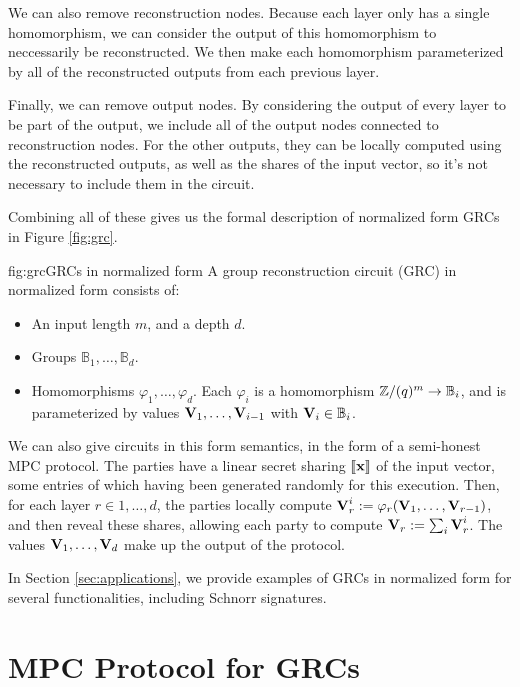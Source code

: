We can also remove reconstruction nodes.
Because each layer only has a single homomorphism, we can consider
the output of this homomorphism to neccessarily be reconstructed.
We then make each homomorphism parameterized by all of the reconstructed
outputs from each previous layer.

Finally, we can remove output nodes.
By considering the output of every layer to be part of the output,
we include all of the output nodes connected to reconstruction nodes.
For the other outputs, they can be locally computed using the reconstructed
outputs, as well as the shares of the input vector, so it's not necessary
to include them in the circuit.

Combining all of these gives us the formal description of normalized form
GRCs in Figure \ref{fig:grc}.

\begin{afigure}{fig:grc}{GRCs in normalized form}
A group reconstruction circuit (GRC) in normalized form consists of:
\begin{itemize}
    \item An input length $m$, and a depth $d$.
    \item Groups $\mathbb{B}_1, \ldots, \mathbb{B}_d$.
    \item Homomorphisms $\varphi_1, \ldots, \varphi_d$. Each $\varphi_i$
    is a homomorphism $\mathbb{Z}/(q)^m \to \mathbb{B}_i$, and is parameterized
    by values $\textbf{V}_1, \ldots, \textbf{V}_{i - 1}$ with $\textbf{V}_i \in \mathbb{B}_i$.
\end{itemize}
\end{afigure}

We can also give circuits in this form semantics, in the form
of a semi-honest MPC protocol.
The parties have a linear secret sharing $\llbracket\textbf{x}\rrbracket$ of
the input vector, some entries of which having been generated randomly
for this execution.
Then, for each layer $r \in 1, \ldots, d$, the parties locally
compute $\textbf{V}_r^i := \varphi_r(\textbf{V}_1, \ldots, \textbf{V}_{r - 1})$,
and then reveal these shares, allowing each party to compute
$\textbf{V}_r := \sum_i \textbf{V}_r^i$.
The values $\textbf{V}_1, \ldots, \textbf{V}_d$ make up the output of the protocol.

In Section \ref{sec:applications}, we provide examples of GRCs
in normalized form for several functionalities, including Schnorr
signatures.

\section{MPC Protocol for GRCs}

